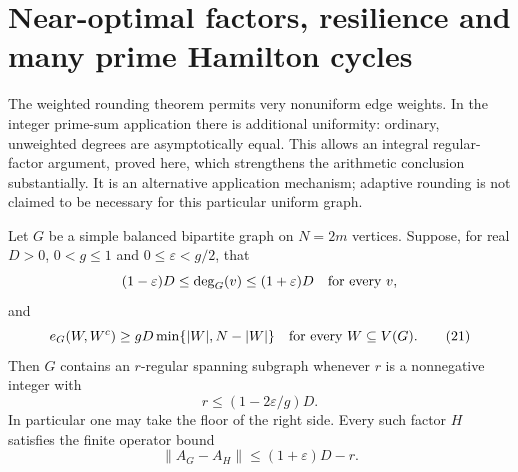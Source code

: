 \section{Near-optimal factors, resilience and many prime Hamilton cycles}
\label{sec:regularfactors}
The weighted rounding theorem permits very nonuniform edge weights.
In the integer prime-sum application there is additional uniformity:
ordinary, unweighted degrees are asymptotically equal.
This allows an integral regular-factor argument, proved here, which
strengthens the arithmetic conclusion substantially.
It is an alternative application mechanism; adaptive rounding is
not claimed to be necessary for this particular uniform graph.

\begin{lemma}
\label{lem:regularfactor}
Let \(G\) be a simple balanced bipartite graph on \(N=2m\)
vertices. Suppose, for real \(D>0\), \(0<g\leq1\) and
\(0\leq\varepsilon<g/2\), that
\[
 (1-\varepsilon)D\leq\deg_G(v)\leq(1+\varepsilon)D
 \quad\hbox{for every }v,
\]
and
\[
 e_G(W,W^c)\geq gD\min\{|W|,N-|W|\}
 \quad\hbox{for every }W\subseteq V(G).
 \tag{21}
\]
Then \(G\) contains an \(r\)-regular spanning subgraph whenever
\(r\) is a nonnegative integer with
\[
 r\leq(1-2\varepsilon/g)D.                                  \tag{22}
\]
In particular one may take the floor of the right side.
Every such factor \(H\) satisfies the finite operator bound
\[
 \|A_G-A_H\|\leq(1+\varepsilon)D-r.                          \tag{23}
\]
\end{lemma}
